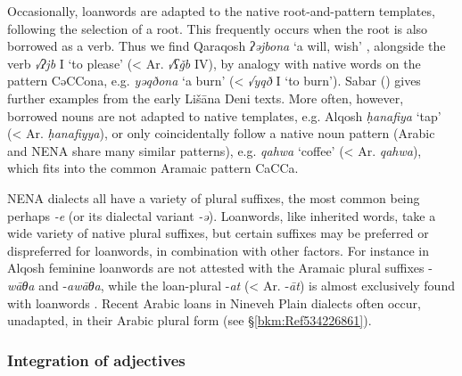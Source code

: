 \documentclass[output=paper]{langsci/langscibook}
\begin{document}
Occasionally, {loanwords} are adapted to the native {root-and-pattern} templates, following the selection of a {root}. This frequently occurs when the {root} is also borrowed as a verb. Thus we find  Qaraqosh \textit{ʔəjbona} ‘a will, wish’ \citep[517]{Khan2002}, alongside the verb \textit{√ʔjb} I ‘to please’ (< Ar. \textit{√ʕǧb} IV), by {analogy} with native words on the pattern CəCCona, e.g. \textit{yəqðona} ‘a burn’ (< \textit{√yqð} I ‘to burn’). Sabar (\citeyear[205]{Sabar1984}) gives further examples from the early Lišāna Deni texts. More often, however, borrowed nouns are not adapted to native templates, e.g. Alqosh \textit{ḥanafiya} ‘tap’ (< Ar. \textit{ḥanafiyya}), or only coincidentally follow a native noun pattern (Arabic and NENA share many similar patterns), e.g. \textit{qahwa} ‘coffee’ (< Ar. \textit{qahwa}), which fits into the common Aramaic pattern CaCCa.

NENA dialects all have a variety of plural suffixes, the most common being perhaps \textit{\nobreakdash-e} (or its dialectal variant \textit{\nobreakdash-ə}). Loanwords, like inherited words, take a wide variety of native plural suffixes, but certain suffixes may be preferred or dispreferred for {loanwords}, in combination with other factors. For instance in  Alqosh feminine {loanwords} are not attested with the Aramaic plural suffixes \nobreakdash-\textit{wāθa} and \nobreakdash-\textit{awāθa}, while the loan-plural \nobreakdash-\textit{at} (< Ar. \nobreakdash-\textit{āt}) is almost exclusively found with {loanwords} \citep[347]{Coghill2005}. Recent Arabic loans in  Nineveh Plain dialects often occur, unadapted, in their Arabic plural form (see §\ref{bkm:Ref534226861}).

\subsubsection{Integration of adjectives}
\end{document}
